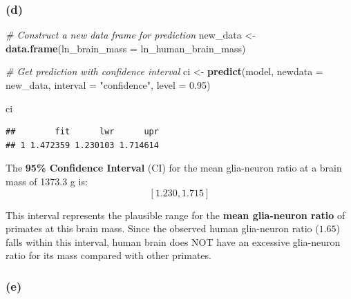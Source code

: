 \documentclass[
]{article}
\newenvironment{Shaded}{\begin{snugshade}}{\end{snugshade}}
\newcommand{\AttributeTok}[1]{\textcolor[rgb]{0.13,0.29,0.53}{#1}}
\newcommand{\CommentTok}[1]{\textcolor[rgb]{0.56,0.35,0.01}{\textit{#1}}}
\newcommand{\FloatTok}[1]{\textcolor[rgb]{0.00,0.00,0.81}{#1}}
\newcommand{\FunctionTok}[1]{\textcolor[rgb]{0.13,0.29,0.53}{\textbf{#1}}}
\newcommand{\NormalTok}[1]{#1}
\newcommand{\OtherTok}[1]{\textcolor[rgb]{0.56,0.35,0.01}{#1}}
\newcommand{\StringTok}[1]{\textcolor[rgb]{0.31,0.60,0.02}{#1}}
\begin{document}
\subsubsection{(d)}\label{d}

\begin{Shaded}
\begin{Highlighting}[]
\CommentTok{\# Construct a new data frame for prediction}
\NormalTok{new\_data }\OtherTok{\textless{}{-}} \FunctionTok{data.frame}\NormalTok{(}\AttributeTok{ln\_brain\_mass =}\NormalTok{ ln\_human\_brain\_mass)}

\CommentTok{\# Get prediction with confidence interval}
\NormalTok{ci }\OtherTok{\textless{}{-}} \FunctionTok{predict}\NormalTok{(model, }\AttributeTok{newdata =}\NormalTok{ new\_data, }\AttributeTok{interval =} \StringTok{"confidence"}\NormalTok{, }\AttributeTok{level =} \FloatTok{0.95}\NormalTok{)}

\NormalTok{ci}
\end{Highlighting}
\end{Shaded}

\begin{verbatim}
##        fit      lwr      upr
## 1 1.472359 1.230103 1.714614
\end{verbatim}

The \textbf{95\% Confidence Interval} (CI) for the mean glia-neuron
ratio at a brain mass of 1373.3 g is: \[
[1.230, 1.715]
\]

This interval represents the plausible range for the \textbf{mean
glia-neuron ratio} of primates at this brain mass. Since the observed
human glia-neuron ratio (\(1.65\)) falls within this interval, human
brain does NOT have an excessive glia-neuron ratio for its mass compared
with other primates.

\subsubsection{(e)}\label{e}
\end{document}
